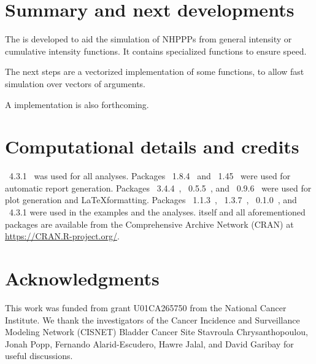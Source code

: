 \documentclass[article,nojss]{jss}\usepackage[]{graphicx}\usepackage[]{xcolor}
\begin{document}

\section{Summary and next developments} \label{sec:summary}

The  is developed to aid the simulation of NHPPPs from general intensity or cumulative intensity functions. It contains specialized functions to ensure speed.

The next steps are a vectorized implementation of some functions, to allow fast simulation over vectors of arguments.

A  implementation is also forthcoming.



\section*{Computational details and credits}

~4.3.1~\citep{R-program}
was used for all analyses.
Packages
~{1.8.4}~\citep{xtable-package} and
~{1.45}~\citep{knitr-package}
were used for automatic report generation. Packages
~{3.4.4}~\citep{ggplot2-package},
~{0.5.5}~\citep{ggridges-package}, and
~{0.9.6}~\citep{latex2exp-package}
were used for plot generation and \LaTeX formatting.
Packages
~{1.1.3}~\citep{bench-package},
~{1.3.7}~\citep{rstream-package},
~{0.1.0}~\citep{otinference-package}, and
~{4.3.1}
were used in the examples and the analyses.
%
 itself
and all aforementioned packages are available from the Comprehensive
 Archive Network (CRAN) at
\url{https://CRAN.R-project.org/}.


\section*{Acknowledgments}
This work was funded from grant U01CA265750  from the National Cancer Institute.
We thank the investigators of the Cancer Incidence and Surveillance Modeling Network (CISNET)
Bladder Cancer Site Stavroula Chrysanthopoulou, Jonah Popp, Fernando Alarid-Escudero,
Hawre Jalal, and David Garibay for useful discussions.
\end{document}
